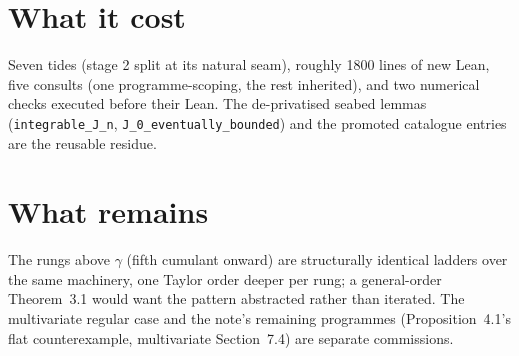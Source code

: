 \documentclass[11pt]{article}
\begin{document}
\section{What it cost}

Seven tides (stage 2 split at its natural seam), roughly 1800 lines of
new Lean, five consults (one programme-scoping, the rest inherited),
and two numerical checks executed before their Lean. The de-privatised
seabed lemmas (\texttt{integrable\_J\_n},
\texttt{J\_0\_eventually\_bounded}) and the promoted catalogue entries
are the reusable residue.

\section{What remains}

The rungs above $\gamma$ (fifth cumulant onward) are structurally
identical ladders over the same machinery, one Taylor order deeper per
rung; a general-order Theorem~3.1 would want the pattern abstracted
rather than iterated. The multivariate regular case and the note's
remaining programmes (Proposition~4.1's flat counterexample,
multivariate Section~7.4) are separate commissions.
\end{document}
